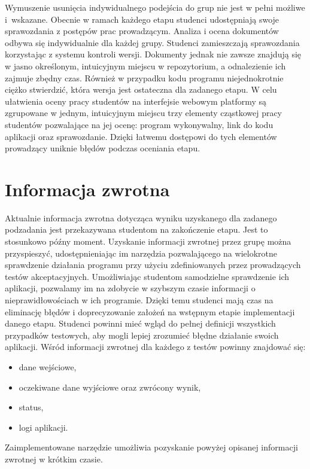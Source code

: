 Wymuszenie usunięcia indywidualnego podejścia do grup nie jest w pełni możliwe i~wskazane.
Obecnie w ramach każdego etapu studenci udostępniają swoje sprawozdania z postępów prac prowadzącym.
Analiza i ocena dokumentów odbywa się indywidualnie dla każdej grupy.
Studenci zamieszczają sprawozdania korzystając z systemu kontroli wersji.
Dokumenty jednak nie zawsze znajdują się w jasno określonym, intuicyjnym miejscu w repozytorium, a odnalezienie ich zajmuje zbędny czas.
Również w przypadku kodu programu niejednokrotnie ciężko stwierdzić, która wersja jest ostateczna dla zadanego etapu.
W celu ułatwienia oceny pracy studentów na interfejsie webowym platformy są zgrupowane w jednym, intuicyjnym miejscu trzy elementy cząstkowej pracy studentów pozwalające na jej ocenę: program wykonywalny, link do kodu aplikacji oraz sprawozdanie.
Dzięki łatwemu dostępowi do tych elementów prowadzący uniknie błędów podczas oceniania etapu.


\section{Informacja zwrotna}

Aktualnie informacja zwrotna dotycząca wyniku uzyskanego dla zadanego podzadania jest przekazywana studentom na zakończenie etapu.
Jest to stosunkowo późny moment.
Uzyskanie informacji zwrotnej przez grupę można przyspieszyć, udostępnieniając im narzędzia pozwalającego na wielokrotne sprawdzenie działania programu przy użyciu zdefiniowanych przez prowadzących testów akceptacyjnych.
Umożliwiając studentom samodzielne sprawdzenie ich aplikacji, pozwalamy im na zdobycie w szybszym czasie informacji o nieprawidłowościach w ich programie.
Dzięki temu studenci mają czas na eliminację błędów i doprecyzowanie założeń na wstępnym etapie implementacji danego etapu.
Studenci powinni mieć wgląd do pełnej definicji wszystkich przypadków testowych, aby mogli lepiej zrozumieć błędne działanie swoich aplikacji.
Wśród informacji zwrotnej dla każdego z testów powinny znajdować się:
\begin{itemize}
    \item dane wejściowe,
    \item oczekiwane dane wyjściowe oraz zwrócony wynik,
    \item status,
    \item logi aplikacji.
\end{itemize}

Zaimplementowane narzędzie umożliwia pozyskanie powyżej opisanej informacji zwrotnej w krótkim czasie.


